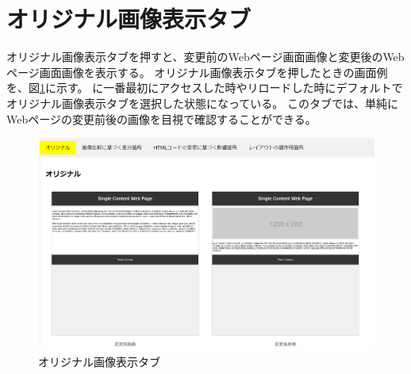 \section{オリジナル画像表示タブ}\label{subsec:original_tab}
オリジナル画像表示タブを押すと、変更前のWebページ画面画像と変更後のWebページ画面画像を表示する。
オリジナル画像表示タブを押したときの画面例を、図\ref{fig: Appearance_original_tab}に示す。
\toolName に一番最初にアクセスした時やリロードした時にデフォルトでオリジナル画像表示タブを選択した状態になっている。
このタブでは、単純にWebページの変更前後の画像を目視で確認することができる。
\begin{figure}[tp]
    \begin{center}
        \includegraphics[width=1.0\columnwidth]{image/3_original_tab.png}
        \caption{オリジナル画像表示タブ}
        \label{fig: Appearance_original_tab}
    \end{center}
\end{figure}



